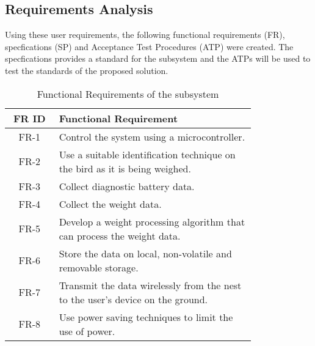 \documentclass[class=report,11pt,crop=false]{standalone}
\begin{document}
\subsection*{Requirements Analysis}

Using these user requirements, the following functional requirements (FR), specfications (SP) and Acceptance Test Procedures (ATP) were created. The specfications provides a standard for the subsystem and the ATPs will be used to test the standards of the proposed solution.

\begin{table}[h]
    {\begin{tabular}{|c|p{0.8\linewidth}|}
            \hline
            \textbf{FR ID} & \textbf{Functional Requirement}                                                \\
            \hline
            FR-1 & Control the system using a microcontroller. \\
            \hline
            FR-2 & Use a suitable identification technique on the bird as it is being weighed. \\
            \hline
            FR-3 & Collect diagnostic battery data. \\
            \hline
            FR-4 & Collect the weight data. \\
            \hline
            FR-5 & Develop a weight processing algorithm that can process the weight data. \\
            \hline
            FR-6 & Store the data on local, non-volatile and removable storage. \\
            \hline
            FR-7 & Transmit the data wirelessly from the nest to the user's device on the ground. \\
            \hline
            FR-8 & Use power saving techniques to limit the use of power. \\
            \hline
        \end{tabular}}
    \caption{Functional Requirements of the subsystem}
    \label{tab:FR}
\end{table}
\end{document}
